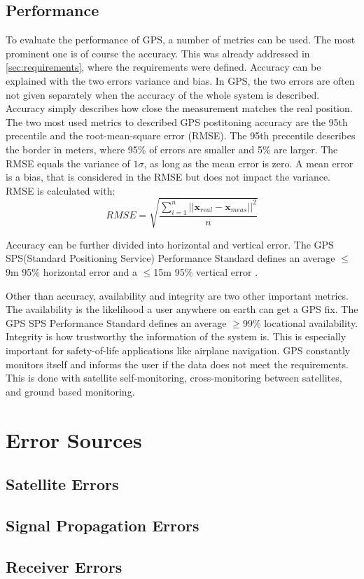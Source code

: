 \subsection{Performance}

To evaluate the performance of GPS, a number of metrics can be used.
The most prominent one is of course the accuracy.
This was already addressed in \ref{sec:requirements}, where the requirements were defined.
Accuracy can be explained with the two errors variance and bias.
In GPS, the two errors are often not given separately when the accuracy of the whole system is described.
Accuracy simply describes how close the measurement matches the real position.
The two most used metrics to described GPS postitoning accuracy are the 95th precentile and the root-mean-square error (RMSE).
The 95th precentile describes the border in meters, where 95\% of errors are smaller and 5\% are larger.
The RMSE equals the variance of $1\sigma$, as long as the mean error is zero.
A mean error is a bias, that is considered in the RMSE but does not impact the variance.
RMSE is calculated with:
$$ RMSE = \sqrt{\frac{\sum\limits_{i=1}^n \lvert\lvert \textbf{x}_{real} - \textbf{x}_{meas} \rvert\rvert^2}{n}} $$

Accuracy can be further divided into horizontal and vertical error.
The GPS SPS(Standard Positioning Service) Performance Standard defines an average $\leq$9m 95\% horizontal error and a $\leq$15m 95\% vertical error \cite{SPS_Performance}.

Other than accuracy, availability and integrity are two other important metrics.
The availability is the likelihood a user anywhere on earth can get a GPS fix.
The GPS SPS Performance Standard defines an average $\geq$99\% locational availability.
Integrity is how trustworthy the information of the system is.
This is especially important for safety-of-life applications like airplane navigation.
GPS constantly monitors itself and informs the user if the data does not meet the requirements.
This is done with satellite self-monitoring, cross-monitoring between satellites, and ground based monitoring.


\section{Error Sources}\label{sec:error_sources}

\subsection{Satellite Errors}

\subsection{Signal Propagation Errors}

\subsection{Receiver Errors}
